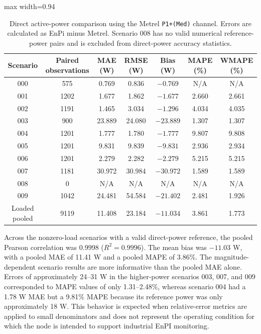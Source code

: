 \documentclass[technologies,article,submit,pdftex,moreauthors]{Definitions/mdpi}
\begin{document}
\begin{table}[!htbp]
\caption{Direct active-power comparison using the Metrel \texttt{P1+(Med)} channel. Errors are calculated as EnPi minus Metrel. Scenario 008 has no valid numerical reference-power pairs and is excluded from direct-power accuracy statistics.}
\label{tab:direct-power-main}
\centering
\scriptsize
\setlength{\tabcolsep}{4pt}
\begin{adjustbox}{max width=0.94\textwidth}
\begin{tabular}{ccccccc}
\toprule
Scenario & Paired observations & MAE (W) & RMSE (W) & Bias (W) & MAPE (\%) & WMAPE (\%) \\
\midrule
000 & 575 & 0.769 & 0.836 & $-0.769$ & N/A & N/A \\
001 & 1202 & 1.677 & 1.862 & $-1.677$ & 2.660 & 2.661 \\
002 & 1191 & 1.465 & 3.034 & $-1.296$ & 4.034 & 4.035 \\
003 & 900 & 23.889 & 24.080 & $-23.889$ & 1.307 & 1.307 \\
004 & 1201 & 1.777 & 1.780 & $-1.777$ & 9.807 & 9.808 \\
005 & 1201 & 9.831 & 9.839 & $-9.831$ & 2.936 & 2.934 \\
006 & 1201 & 2.279 & 2.282 & $-2.279$ & 5.215 & 5.215 \\
007 & 1181 & 30.972 & 30.984 & $-30.972$ & 1.589 & 1.589 \\
008 & 0 & N/A & N/A & N/A & N/A & N/A \\
009 & 1042 & 24.481 & 54.584 & $-21.402$ & 2.481 & 1.926 \\
Loaded pooled & 9119 & 11.408 & 23.184 & $-11.034$ & 3.861 & 1.773 \\
\bottomrule
\end{tabular}
\end{adjustbox}
\end{table}

Across the nonzero-load scenarios with a valid direct-power reference, the pooled Pearson correlation was 0.9998 ($R^2=0.9996$). The mean bias was $-11.03$ W, with a pooled MAE of 11.41 W and a pooled MAPE of 3.86\%. The magnitude-dependent scenario results are more informative than the pooled MAE alone. Errors of approximately 24--31 W in the higher-power scenarios 003, 007, and 009 corresponded to MAPE values of only 1.31--2.48\%, whereas scenario 004 had a 1.78 W MAE but a 9.81\% MAPE because its reference power was only approximately 18 W. This behavior is expected when relative-error metrics are applied to small denominators and does not represent the operating condition for which the node is intended to support industrial EnPI monitoring.
\end{document}
